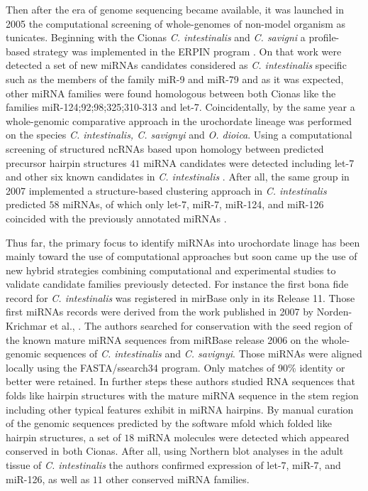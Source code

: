 \documentclass[graybox]{svmult}
\begin{document}
Then after the era of genome sequencing became available, it was launched in 2005 the computational screening of whole-genomes of non-model organism as tunicates. Beginning with the Cionas \textit{C. intestinalis} and \textit{C. savigni} a profile-based strategy was implemented in the ERPIN program \cite{Legendre2005}. On that work were detected a set of new miRNAs candidates considered as \textit{C. intestinalis} specific such as the members of the family miR-9 and miR-79 and as it was expected, other miRNA families were found homologous between both Cionas like the families miR-124;92;98;325;310-313 and let-7. Coincidentally, by the same year a whole-genomic comparative approach in the urochordate lineage was performed on the species \textit{C. intestinalis, C. savignyi} and \textit{O. dioica}. Using a computational screening of structured ncRNAs based upon homology between predicted precursor hairpin structures  $41$ miRNA candidates were detected including let-7 and other six known candidates in \textit{C. intestinalis} \cite{Missal2005}. After all, the same group in 2007 implemented a structure-based clustering approach in \textit{C. intestinalis} predicted $58$ miRNAs, of which only let-7, miR-7, miR-124, and miR-126 coincided with the previously annotated miRNAs \cite{Will2007}. 

Thus far, the primary focus to identify miRNAs into urochordate linage has been mainly toward the use of computational approaches but soon came up the use of new hybrid strategies combining computational and experimental studies to validate candidate families previously detected. For instance the first bona fide record for \textit{C. intestinalis} was registered in mirBase only in its Release 11. Those first miRNAs records were derived from the work published in 2007 by Norden-Krichmar et al., \cite{Norden-Krichmar2007}. The authors searched for conservation with the seed region of the known mature miRNA sequences from miRBase release 2006 on the whole-genomic sequences of \textit{C. intestinalis} and \textit{C. savignyi}. Those miRNAs were aligned locally using the FASTA/ssearch34 program. Only matches of 90\% identity or better were retained. In further steps these authors studied RNA sequences that folds like hairpin structures with the mature miRNA sequence in the stem region including other typical features exhibit in miRNA hairpins. By manual curation of the genomic sequences predicted by the software mfold which folded like hairpin structures, a set of $18$ miRNA molecules were detected which appeared conserved in both Cionas. After all, using  Northern blot analyses in the adult tissue of \textit{C. intestinalis} the authors confirmed expression of  let-7, miR-7, and miR-126, as well as $11$ other conserved miRNA families.
\end{document}
